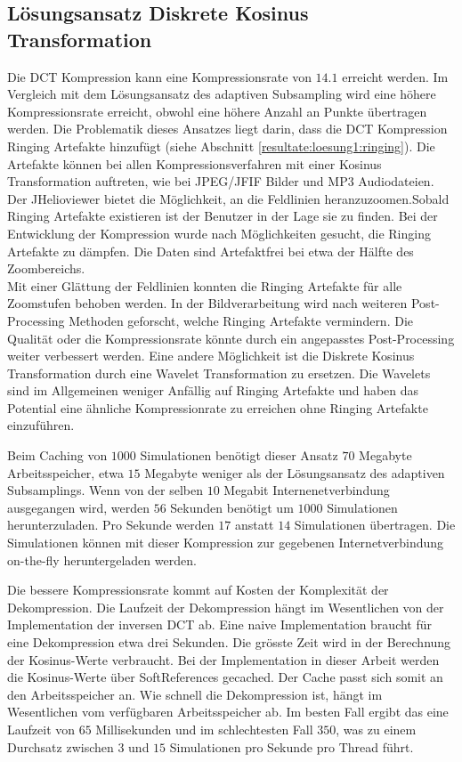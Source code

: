 \subsection{Lösungsansatz Diskrete Kosinus Transformation}
Die DCT Kompression kann eine Kompressionsrate von $14.1$ erreicht werden. Im Vergleich mit dem Lösungsansatz des adaptiven Subsampling wird eine höhere Kompressionsrate erreicht, obwohl eine höhere Anzahl an Punkte übertragen werden. Die Problematik dieses Ansatzes liegt darin, dass die DCT Kompression Ringing Artefakte hinzufügt (siehe Abschnitt \ref{resultate:loesung1:ringing}). Die Artefakte können bei allen Kompressionsverfahren mit einer Kosinus Transformation auftreten, wie bei JPEG/JFIF Bilder und MP3 Audiodateien.\\
Der JHelioviewer bietet die Möglichkeit, an die Feldlinien heranzuzoomen.Sobald Ringing Artefakte existieren ist der Benutzer in der Lage sie zu finden. Bei der Entwicklung der Kompression wurde nach Möglichkeiten gesucht, die Ringing Artefakte zu dämpfen. Die Daten sind Artefaktfrei bei etwa der Hälfte des Zoombereichs.\\
Mit einer Glättung der Feldlinien konnten die Ringing Artefakte für alle Zoomstufen behoben werden. In der Bildverarbeitung wird nach weiteren Post-Processing Methoden geforscht, welche Ringing Artefakte vermindern. Die Qualität oder die Kompressionsrate könnte durch ein angepasstes Post-Processing weiter verbessert werden. Eine andere Möglichkeit ist die Diskrete Kosinus Transformation durch eine Wavelet Transformation zu ersetzen. Die Wavelets sind im Allgemeinen weniger Anfällig auf Ringing Artefakte und haben das Potential eine ähnliche Kompressionrate zu erreichen ohne Ringing Artefakte einzuführen.

Beim Caching von $1000$ Simulationen benötigt dieser Ansatz $70$ Megabyte Arbeitsspeicher, etwa $15$ Megabyte weniger als der Lösungsansatz des adaptiven Subsamplings. Wenn von der selben $10$ Megabit Internenetverbindung ausgegangen wird, werden $56$ Sekunden benötigt um $1000$ Simulationen herunterzuladen. Pro Sekunde werden $17$ anstatt $14$ Simulationen übertragen. Die Simulationen können mit dieser Kompression zur gegebenen Internetverbindung on-the-fly heruntergeladen werden.

Die bessere Kompressionsrate kommt auf Kosten der Komplexität der Dekompression. Die Laufzeit der Dekompression hängt im Wesentlichen von der Implementation der inversen DCT ab. Eine naive Implementation braucht für eine Dekompression etwa drei Sekunden. Die grösste Zeit wird in der Berechnung der Kosinus-Werte verbraucht. Bei der Implementation in dieser Arbeit werden die Kosinus-Werte über SoftReferences gecached. Der Cache passt sich somit an den Arbeitsspeicher an. Wie schnell die Dekompression ist, hängt im Wesentlichen vom verfügbaren Arbeitsspeicher ab. Im besten Fall ergibt das eine Laufzeit von $65$ Millisekunden und im schlechtesten Fall $350$, was zu einem Durchsatz zwischen $3$ und $15$ Simulationen pro Sekunde pro Thread führt.

